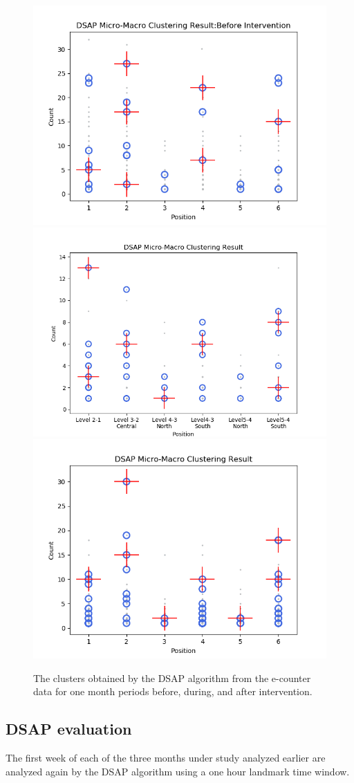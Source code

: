 \begin{figure}[!t]
    \centering
    \includegraphics[width=.47\textwidth]{image/Chapters/Chapter6/DSAPBeforeMonthIntervention.png}
    \includegraphics[width=.51\textwidth]{image/Chapters/Chapter6/window10H.png}
    \includegraphics[width=.49\textwidth]{image/Chapters/Chapter6/DSAPAFTERmonthIntervention.png}
    \caption{The clusters obtained by the DSAP algorithm from the e-counter data for one month periods before, during, and after intervention.}
    \label{dsap3mon}
\end{figure}


\subsection{DSAP evaluation}


The first week of each of the three months under study analyzed earlier are analyzed again by the DSAP algorithm using a one hour landmark time window. 

